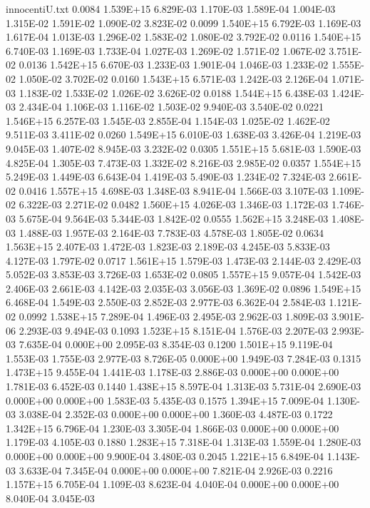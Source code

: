 \begin{filecontents}{innocentiU.txt}
0.0084 1.539E+15 6.829E-03 1.170E-03 1.589E-04 1.004E-03 1.315E-02 1.591E-02 1.090E-02 3.823E-02
0.0099 1.540E+15 6.792E-03 1.169E-03 1.617E-04 1.013E-03 1.296E-02 1.583E-02 1.080E-02 3.792E-02
0.0116 1.540E+15 6.740E-03 1.169E-03 1.733E-04 1.027E-03 1.269E-02 1.571E-02 1.067E-02 3.751E-02
0.0136 1.542E+15 6.670E-03 1.233E-03 1.901E-04 1.046E-03 1.233E-02 1.555E-02 1.050E-02 3.702E-02
0.0160 1.543E+15 6.571E-03 1.242E-03 2.126E-04 1.071E-03 1.183E-02 1.533E-02 1.026E-02 3.626E-02
0.0188 1.544E+15 6.438E-03 1.424E-03 2.434E-04 1.106E-03 1.116E-02 1.503E-02 9.940E-03 3.540E-02
0.0221 1.546E+15 6.257E-03 1.545E-03 2.855E-04 1.154E-03 1.025E-02 1.462E-02 9.511E-03 3.411E-02
0.0260 1.549E+15 6.010E-03 1.638E-03 3.426E-04 1.219E-03 9.045E-03 1.407E-02 8.945E-03 3.232E-02
0.0305 1.551E+15 5.681E-03 1.590E-03 4.825E-04 1.305E-03 7.473E-03 1.332E-02 8.216E-03 2.985E-02
0.0357 1.554E+15 5.249E-03 1.449E-03 6.643E-04 1.419E-03 5.490E-03 1.234E-02 7.324E-03 2.661E-02
0.0416 1.557E+15 4.698E-03 1.348E-03 8.941E-04 1.566E-03 3.107E-03 1.109E-02 6.322E-03 2.271E-02
0.0482 1.560E+15 4.026E-03 1.346E-03 1.172E-03 1.746E-03 5.675E-04 9.564E-03 5.344E-03 1.842E-02
0.0555 1.562E+15 3.248E-03 1.408E-03 1.488E-03 1.957E-03 2.164E-03 7.783E-03 4.578E-03 1.805E-02
0.0634 1.563E+15 2.407E-03 1.472E-03 1.823E-03 2.189E-03 4.245E-03 5.833E-03 4.127E-03 1.797E-02
0.0717 1.561E+15 1.579E-03 1.473E-03 2.144E-03 2.429E-03 5.052E-03 3.853E-03 3.726E-03 1.653E-02
0.0805 1.557E+15 9.057E-04 1.542E-03 2.406E-03 2.661E-03 4.142E-03 2.035E-03 3.056E-03 1.369E-02
0.0896 1.549E+15 6.468E-04 1.549E-03 2.550E-03 2.852E-03 2.977E-03 6.362E-04 2.584E-03 1.121E-02
0.0992 1.538E+15 7.289E-04 1.496E-03 2.495E-03 2.962E-03 1.809E-03 3.901E-06 2.293E-03 9.494E-03
0.1093 1.523E+15 8.151E-04 1.576E-03 2.207E-03 2.993E-03 7.635E-04 0.000E+00 2.095E-03 8.354E-03
0.1200 1.501E+15 9.119E-04 1.553E-03 1.755E-03 2.977E-03 8.726E-05 0.000E+00 1.949E-03 7.284E-03
0.1315 1.473E+15 9.455E-04 1.441E-03 1.178E-03 2.886E-03 0.000E+00 0.000E+00 1.781E-03 6.452E-03
0.1440 1.438E+15 8.597E-04 1.313E-03 5.731E-04 2.690E-03 0.000E+00 0.000E+00 1.583E-03 5.435E-03
0.1575 1.394E+15 7.009E-04 1.130E-03 3.038E-04 2.352E-03 0.000E+00 0.000E+00 1.360E-03 4.487E-03
0.1722 1.342E+15 6.796E-04 1.230E-03 3.305E-04 1.866E-03 0.000E+00 0.000E+00 1.179E-03 4.105E-03
0.1880 1.283E+15 7.318E-04 1.313E-03 1.559E-04 1.280E-03 0.000E+00 0.000E+00 9.900E-04 3.480E-03
0.2045 1.221E+15 6.849E-04 1.143E-03 3.633E-04 7.345E-04 0.000E+00 0.000E+00 7.821E-04 2.926E-03
0.2216 1.157E+15 6.705E-04 1.109E-03 8.623E-04 4.040E-04 0.000E+00 0.000E+00 8.040E-04 3.045E-03

\end{filecontents}
